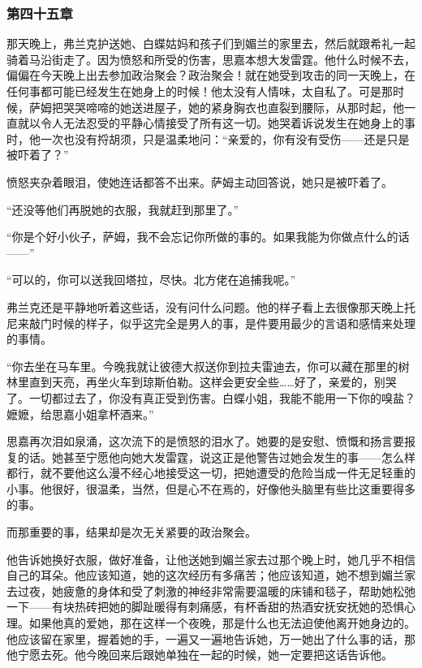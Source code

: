 \subsubsection{第四十五章}

\par 那天晚上，弗兰克护送她、白蝶姑妈和孩子们到媚兰的家里去，然后就跟希礼一起骑着马沿街走了。因为愤怒和所受的伤害，思嘉本想大发雷霆。他什么时候不去，偏偏在今天晚上出去参加政治聚会？政治聚会！就在她受到攻击的同一天晚上，在任何事都可能已经发生在她身上的时候！他太没有人情味，太自私了。可是那时候，萨姆把哭哭啼啼的她送进屋子，她的紧身胸衣也直裂到腰际，从那时起，他一直就以令人无法忍受的平静心情接受了所有这一切。她哭着诉说发生在她身上的事时，他一次也没有捋胡须，只是温柔地问：“亲爱的，你有没有受伤——还是只是被吓着了？”
\par 愤怒夹杂着眼泪，使她连话都答不出来。萨姆主动回答说，她只是被吓着了。
\par “还没等他们再脱她的衣服，我就赶到那里了。”
\par “你是个好小伙子，萨姆，我不会忘记你所做的事的。如果我能为你做点什么的话——”
\par “可以的，你可以送我回塔拉，尽快。北方佬在追捕我呢。”
\par 弗兰克还是平静地听着这些话，没有问什么问题。他的样子看上去很像那天晚上托尼来敲门时候的样子，似乎这完全是男人的事，是件要用最少的言语和感情来处理的事情。
\par “你去坐在马车里。今晚我就让彼德大叔送你到拉夫雷迪去，你可以藏在那里的树林里直到天亮，再坐火车到琼斯伯勒。这样会更安全些……好了，亲爱的，别哭了。一切都过去了，你没有真正受到伤害。白蝶小姐，我能不能用一下你的嗅盐？嬷嬷，给思嘉小姐拿杯酒来。”
\par 思嘉再次泪如泉涌，这次流下的是愤怒的泪水了。她要的是安慰、愤慨和扬言要报复的话。她甚至宁愿他向她大发雷霆，说这正是他警告过她会发生的事——怎么样都行，就不要他这么漫不经心地接受这一切，把她遭受的危险当成一件无足轻重的小事。他很好，很温柔，当然，但是心不在焉的，好像他头脑里有些比这重要得多的事。
\par 而那重要的事，结果却是次无关紧要的政治聚会。
\par 他告诉她换好衣服，做好准备，让他送她到媚兰家去过那个晚上时，她几乎不相信自己的耳朵。他应该知道，她的这次经历有多痛苦；他应该知道，她不想到媚兰家去过夜，她疲惫的身体和受了刺激的神经非常需要温暖的床铺和毯子，帮助她松弛一下——有块热砖把她的脚趾暖得有刺痛感，有杯香甜的热酒安抚安抚她的恐惧心理。如果他真的爱她，那在这样一个夜晚，那是什么也无法迫使他离开她身边的。他应该留在家里，握着她的手，一遍又一遍地告诉她，万一她出了什么事的话，那他宁愿去死。他今晚回来后跟她单独在一起的时候，她一定要把这话告诉他。
